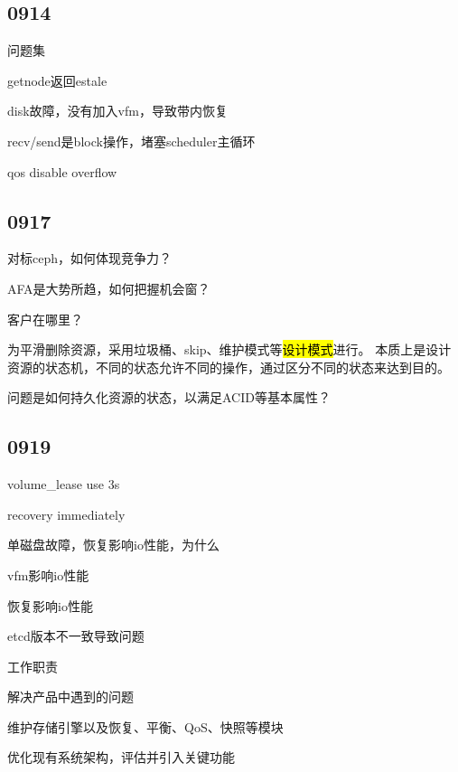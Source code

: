\subsection{0914}

问题集
\begin{enumbox}
\item getnode返回estale
\item disk故障，没有加入vfm，导致带内恢复
\item recv/send是block操作，堵塞scheduler主循环
\item qos disable overflow
\end{enumbox}

\subsection{0917}

\begin{enumbox}
\item 对标ceph，如何体现竞争力？
\item AFA是大势所趋，如何把握机会窗？
\item 客户在哪里？
\end{enumbox}

为平滑删除资源，采用垃圾桶、skip、维护模式等\hl{设计模式}进行。
本质上是设计资源的状态机，不同的状态允许不同的操作，通过区分不同的状态来达到目的。

问题是如何持久化资源的状态，以满足ACID等基本属性？

\subsection{0919}

\begin{enumbox}
\item volume\_lease use 3s
\item recovery immediately
\item 单磁盘故障，恢复影响io性能，为什么
\item vfm影响io性能
\item 恢复影响io性能
\item etcd版本不一致导致问题
\end{enumbox}

工作职责
\begin{enumbox}
\item 解决产品中遇到的问题
\item 维护存储引擎以及恢复、平衡、QoS、快照等模块
\item 优化现有系统架构，评估并引入关键功能
\end{enumbox}

